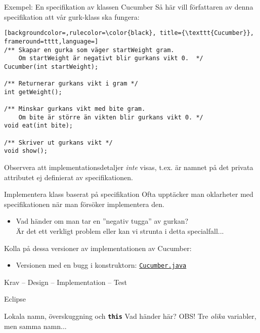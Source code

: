 \documentclass{lecturenotes}
\begin{document}
\begin{Slide}{Exempel: En specifikation av klassen Cucumber}
\footnotesize Så här vill författaren av denna specifikation att vår gurk-klass ska fungera:
\begin{lstlisting}[backgroundcolor=,rulecolor=\color{black}, title={\texttt{Cucumber}}, frameround=tttt,language=]
/** Skapar en gurka som väger startWeight gram. 
    Om startWeight är negativt blir gurkans vikt 0.  */
Cucumber(int startWeight);

/** Returnerar gurkans vikt i gram */
int getWeight();

/** Minskar gurkans vikt med bite gram. 
    Om bite är större än vikten blir gurkans vikt 0. */
void eat(int bite);

/** Skriver ut gurkans vikt */
void show();
\end{lstlisting}
Observera att implementationsdetaljer \textit{inte} visas, t.ex. är namnet på det privata attributet ej definierat av specifikationen.
\end{Slide}

\begin{Slide}{Implementera klass baserat på specifikation} \footnotesize
Ofta upptäcker man oklarheter med specifikationen när man försöker implementera den.
\begin{itemize}
\item Vad händer om man tar en ''negativ tugga'' av gurkan? \\
Är det ett verkligt problem eller kan vi strunta i detta specialfall...
\end{itemize}
Kolla på dessa versioner av implementationen av Cucumber:
\begin{itemize}
\item Versionen med en bugg i konstruktorn: \href{https://github.com/bjornregnell/lth-eda016-2015/blob/master/lectures/examples/terminal/constructor/Cucumber.java}{\texttt{Cucumber.java}}
\end{itemize}
\end{Slide}

\begin{Slide}{Krav -- Design -- Implementation -- Test}
\end{Slide}

\begin{Slide}{Eclipse}
\end{Slide}

\begin{Slide}{Lokala namn, överskuggning och \texttt{\textbf{this}}}
\scriptsize Vad händer här? OBS! Tre \textit{olika} variabler, men samma namn...

\end{Slide}
\end{document}
